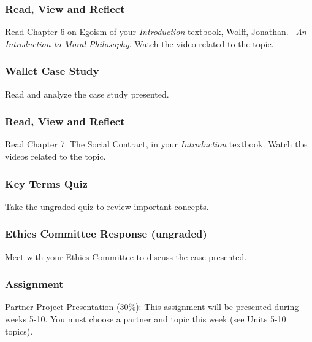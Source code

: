 \documentclass[
]{book}
\begin{document}
\begin{reflect}
\hypertarget{read-view-and-reflect-6}{%
\subsubsection*{Read, View and Reflect}\label{read-view-and-reflect-6}}

Read Chapter 6 on Egoism of your \emph{Introduction} textbook, Wolff, Jonathan. ~\emph{An Introduction to Moral Philosophy}. Watch the video related to the topic.

\hypertarget{wallet-case-study}{%
\subsubsection*{Wallet Case Study}\label{wallet-case-study}}

Read and analyze the case study presented.

\hypertarget{read-view-and-reflect-7}{%
\subsubsection*{Read, View and Reflect}\label{read-view-and-reflect-7}}

Read Chapter 7: The Social Contract, in your \emph{Introduction} textbook\emph{.} Watch the videos related to the topic.

\hypertarget{key-terms-quiz-1}{%
\subsubsection*{Key Terms Quiz}\label{key-terms-quiz-1}}

Take the ungraded quiz to review important concepts.

\hypertarget{ethics-committee-response-ungraded}{%
\subsubsection*{Ethics Committee Response (ungraded)}\label{ethics-committee-response-ungraded}}

Meet with your Ethics Committee to discuss the case presented.

\hypertarget{assignment-2}{%
\subsubsection*{\texorpdfstring{\textbf{Assignment}}{Assignment}}\label{assignment-2}}

Partner Project Presentation (30\%):
This assignment will be presented during weeks 5-10. You must choose a partner and topic this week (see Units 5-10 topics).
\end{reflect}
\end{document}
